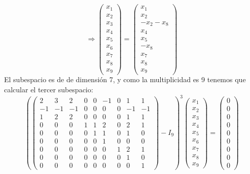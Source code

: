 \documentclass{article}
\begin{document}
$$
\Rightarrow
\left(\begin{array}{c}
    x_1 \\
    x_2 \\
    x_3 \\
    x_4 \\
    x_5 \\
    x_6 \\
    x_7 \\
    x_8 \\
    x_9
\end{array}\right)
=
\left(\begin{array}{c}
    x_1 \\
    x_2 \\
    -x_2-x_8 \\
    x_4 \\
    x_5 \\
    -x_8 \\
    x_7 \\
    x_8 \\
    x_9
\end{array}\right)
$$
El subespacio es de de dimensión 7, y como la multiplicidad es 9 tenemos que calcular el tercer subespacio:
$$
\left(
\left(\begin{array}{ccccccccc}
     2 & 3 & 2 & 0 & 0 &-1 & 0 & 1 & 1\\
    -1 &-1 &-1 & 0 & 0 & 0 & 0 &-1 &-1\\
     1 & 2 & 2 & 0 & 0 & 0 & 0 & 1 & 1\\
     0 & 0 & 0 & 1 & 1 & 2 & 0 & 2 & 1\\
     0 & 0 & 0 & 0 & 1 & 1 & 0 & 1 & 0\\
     0 & 0 & 0 & 0 & 0 & 1 & 0 & 0 & 0\\
     0 & 0 & 0 & 0 & 0 & 0 & 1 & 2 & 1\\
     0 & 0 & 0 & 0 & 0 & 0 & 0 & 1 & 0\\
     0 & 0 & 0 & 0 & 0 & 0 & 0 & 0 & 1
\end{array}\right)-I_9
\right)^3
\left(\begin{array}{c}
    x_1\\
    x_2 \\
    x_3 \\
    x_4 \\
    x_5 \\
    x_6 \\
    x_7 \\
    x_8 \\
    x_9
\end{array}\right)
=
\left(\begin{array}{c}
    0\\
    0 \\
    0 \\
    0 \\
    0 \\
    0 \\
    0 \\
    0 \\
    0
\end{array}\right)
$$
\end{document}
